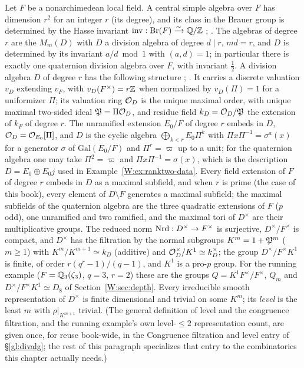 Let $F$ be a nonarchimedean local field.  A central simple algebra over
$F$ has dimension $r^2$ for an integer $r$ (its degree), and its class in
the Brauer group is determined by the Hasse invariant
$\mathrm{inv}:\mathrm{Br}(F)\xrightarrow{\sim}\mathbb Q/\mathbb Z$ \cite[Ch.~XIII]{Ser79}; \cite[\S31]{Rei75}.  The algebras of degree $r$ are the $M_m(D)$ with $D$ a division
algebra of degree $d\mid r$, $md=r$, and $D$ is determined by its
invariant $a/d\bmod1$ with $(a,d)=1$; in particular there is exactly one
quaternion division algebra over $F$, with invariant $\tfrac12$.  A
division algebra $D$ of degree $r$ has the following structure
\cite[\S\S12--14]{Rei75}; \cite[Ch.~I]{Wei73}.  It carries a discrete valuation $v_D$
extending $v_F$, with $v_D(F^\times)=r\mathbb Z$ when normalized by
$v_D(\Pi)=1$ for a uniformizer $\Pi$; its valuation ring $\mathcal O_D$ is the
unique maximal order, with unique maximal two-sided ideal
$\mathfrak P=\Pi\mathcal O_D$, and residue field $k_D=\mathcal O_D/\mathfrak P$ the extension of
$k_F$ of degree $r$.  The unramified extension $E_0/F$ of degree $r$
embeds in $D$, $\mathcal O_D=\mathcal O_{E_0}[\Pi]$, and $D$ is the cyclic algebra
$\bigoplus_{k<r}E_0\Pi^k$ with $\Pi x\Pi^{-1}=\sigma^a(x)$ for a
generator $\sigma$ of $\mathrm{Gal}(E_0/F)$ and $\Pi^r=\varpi$ up to a
unit; for the quaternion algebra one may take $\Pi^2=\varpi$ and
$\Pi x\Pi^{-1}=\sigma(x)$, which is the description
$D=E_0\oplus E_0j$ used in Example~\ref{W:ex:ranktwo-data}.  Every field
extension of $F$ of degree $r$ embeds in $D$ as a maximal subfield, and
when $r$ is prime (the case of this book), every element of
$D\setminus F$ generates a maximal subfield; the
maximal subfields of the quaternion algebra are the three quadratic
extensions of $F$ ($p$ odd), one unramified and two ramified, and the
maximal tori of $D^\times$ are their multiplicative groups.  The reduced
norm $\operatorname{Nrd}:D^\times\to F^\times$ is surjective, $D^\times/F^\times$ is
compact, and $D^\times$ has the filtration by the normal subgroups
$K^m=1+\mathfrak P^m$ ($m\ge1$) with $K^m/K^{m+1}\simeq k_D$ (additive) and
$\mathcal O_D^\times/K^1\simeq k_D^\times$; the group $D^\times/F^\times K^1$
is finite, of order $r(q^r-1)/(q-1)$, and $K^1$ is a pro-$p$ group.  For
the running example ($F=\mathbb Q_3(\zeta_3)$, $q=3$, $r=2$) these are the
groups $Q=K^1F^\times/F^\times$, $Q_m$ and $D^\times/F^\times K^1\simeq D_8$
of Section~\ref{W:sec:depth}.  Every irreducible smooth representation of
$D^\times$ is finite dimensional and trivial on some $K^m$; its
\emph{level} is the least $m$ with $\rho|_{K^{m+1}}$ trivial. (The
general definition of level and the congruence filtration, and the
running example's own level-$\le2$ representation count, are given
once, for reuse book-wide, in the Congruence filtration and level
entry of \S\ref{gl:divalg}; the rest of this paragraph specializes
that entry to the combinatorics this chapter actually needs.)

